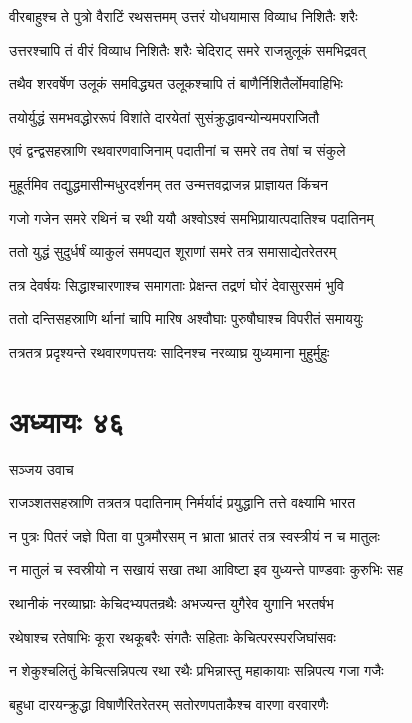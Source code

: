 \twolineshloka
{वीरबाहुश्च ते पुत्रो वैराटिं रथसत्तमम्}
{उत्तरं योधयामास विव्याध निशितैः शरैः}


\twolineshloka
{उत्तरश्चापि तं वीरं विव्याध निशितैः शरैः}
{चेदिराट् समरे राजन्नुलूकं समभिद्रवत्}


\twolineshloka
{तथैव शरवर्षेण उलूकं समविद्ध्यत}
{उलूकश्चापि तं बाणैर्निशितैर्लोमवाहिभिः}


\twolineshloka
{तयोर्युद्धं समभवद्धोररूपं विशांते}
{दारयेतां सुसंक्रुद्धावन्योन्यमपराजितौ}


\twolineshloka
{एवं द्वन्द्वसहस्राणि रथवारणवाजिनाम्}
{पदातीनां च समरे तव तेषां च संकुले}


\twolineshloka
{मुहूर्तमिव तद्युद्धमासीन्मधुरदर्शनम्}
{तत उन्मत्तवद्राजन्न प्राज्ञायत किंचन}


\twolineshloka
{गजो गजेन समरे रथिनं च रथी ययौ}
{अश्वोऽश्वं समभिप्रायात्पदातिश्च पदातिनम्}


\twolineshloka
{ततो युद्धं सुदुर्धर्षं व्याकुलं समपद्यत}
{शूराणां समरे तत्र समासाद्येतरेतरम्}


\twolineshloka
{तत्र देवर्षयः सिद्धाश्चारणाश्च समागताः}
{प्रेक्षन्त तद्रणं घोरं देवासुरसमं भुवि}


\twolineshloka
{ततो दन्तिसहस्राणि र्थानां चापि मारिष}
{अश्वौघाः पुरुषौघाश्च विपरीतं समाययुः}


\twolineshloka
{तत्रतत्र प्रदृश्यन्ते रथवारणपत्तयः}
{सादिनश्च नरव्याघ्र युध्यमाना मुहुर्मुहुः}


\chapter{अध्यायः ४६}
\twolineshloka
{सञ्जय उवाच}
{}


\twolineshloka
{राजञ्शतसहस्राणि तत्रतत्र पदातिनाम्}
{निर्मर्यादं प्रयुद्धानि तत्ते वक्ष्यामि भारत}


\twolineshloka
{न पुत्रः पितरं जज्ञे पिता वा पुत्रमौरसम्}
{न भ्राता भ्रातरं तत्र स्वस्त्रीयं न च मातुलः}


\twolineshloka
{न मातुलं च स्वस्रीयो न सखायं सखा तथा}
{आविष्टा इव युध्यन्ते पाण्डवाः कुरुभिः सह}


\twolineshloka
{रथानीकं नरव्याघ्राः केचिदभ्यपतन्रथैः}
{अभज्यन्त युगैरेव युगानि भरतर्षभ}


\twolineshloka
{रथेषाश्च रतेषाभिः कूरा रथकूबरैः}
{संगतैः सहिताः केचित्परस्परजिघांसवः}


\twolineshloka
{न शेकुश्चलितुं केचित्सन्निपत्य रथा रथैः}
{प्रभिन्नास्तु महाकायाः सन्निपत्य गजा गजैः}


\twolineshloka
{बहुधा दारयन्क्रुद्धा विषाणैरितरेतरम्}
{सतोरणपताकैश्च वारणा वरवारणैः}


